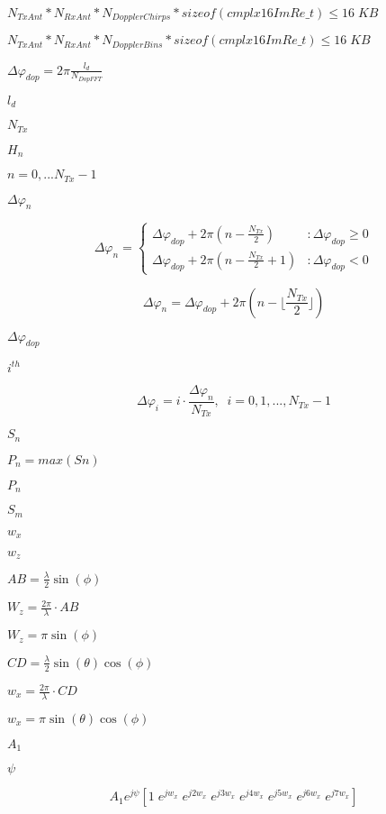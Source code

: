 \documentclass{article}
\begin{document}
$N_{TxAnt}*N_{RxAnt}*N_{DopplerChirps}*sizeof(cmplx16ImRe\_t) \leq 16\;KB$
\pagebreak

$N_{TxAnt}*N_{RxAnt}*N_{DopplerBins}*sizeof(cmplx16ImRe\_t) \leq 16\;KB$
\pagebreak

$\Delta\varphi_{dop}=2\pi\frac{l_d}{N_{DopFFT}}$
\pagebreak

$l_d$
\pagebreak

$N_{Tx}$
\pagebreak

$H_n$
\pagebreak

$ n=0,...N_{Tx}-1$
\pagebreak

$\Delta\varphi_n$
\pagebreak

\[ \Delta\varphi_n= \left\{ \begin{array}{lr} \Delta\varphi_{dop}+2\pi(n-\frac{N_{Tx}}{2}) & : \Delta\varphi_{dop} \ge 0\\ \Delta\varphi_{dop}+2\pi(n-\frac{N_{Tx}}{2}+1) & : \Delta\varphi_{dop} < 0 \end{array}\right. \]
\pagebreak

\[ \Delta\varphi_n= \Delta\varphi_{dop}+2\pi(n- \lfloor\frac{N_{Tx}}{2}\rfloor) \]
\pagebreak

$\Delta\varphi_{dop}$
\pagebreak

$i^{th}$
\pagebreak

\[ \Delta\varphi_i= i \cdot \frac{\Delta\varphi_n}{N_{Tx}}, \;\; i=0,1,...,N_{Tx} - 1 \]
\pagebreak

$S_n$
\pagebreak

$P_n = max(Sn)$
\pagebreak

$P_n$
\pagebreak

$S_m$
\pagebreak

$w_x$
\pagebreak

$w_z$
\pagebreak

$AB = \frac{\lambda}{2} \sin (\phi)$
\pagebreak

$W_z = \frac{2\pi}{\lambda} \cdot AB$
\pagebreak

$W_z = \pi \sin (\phi)$
\pagebreak

$CD = \frac{\lambda}{2} \sin (\theta) \cos (\phi)$
\pagebreak

$w_x = \frac{2\pi}{\lambda} \cdot CD$
\pagebreak

$w_x = \pi \sin (\theta) \cos (\phi)$
\pagebreak

$A_1$
\pagebreak

$\psi$
\pagebreak

\[ A_1 e^{j\psi} [ 1 \; e^{jw_x} \; e^{j2w_x} \; e^{j3w_x} \; e^{j4w_x} \; e^{j5w_x} \; e^{j6w_x} \; e^{j7w_x} ] \]
\pagebreak
\end{document}
